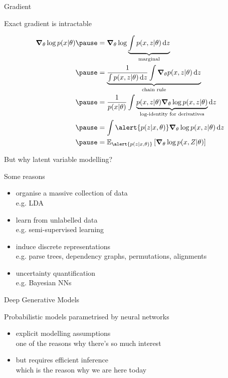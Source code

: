 \documentclass[14pt]{beamer}
\begin{document}
\begin{frame}{Gradient}

Exact gradient is intractable
\begin{small}
\begin{equation*}
\begin{aligned}
\grad_\theta \log p(x|\theta) \pause &= \grad_\theta \log \underbrace{\int p(x, z|\theta) \dd{z}}_{\text{marginal}} \\ \pause
&= \underbrace{\frac{1}{\int p(x, z|\theta) \dd{z}} \int \grad_\theta p(x,z|\theta) \dd{z}}_{\text{chain rule}} \\ \pause
&= \frac{1}{p(x|\theta)} \int \underbrace{p(x,z|\theta) \grad_\theta \log p(x,z|\theta)}_{\text{log-identity for derivatives}} \dd{z} \\ \pause
&= \int \alert{p(z|x, \theta)} \grad_\theta \log p(x,z|\theta) \dd{z} \\ \pause
&= \mathbb E_{\alert{p(z|x, \theta)}} \left[ \grad_\theta \log p(x,Z|\theta) \right]
\end{aligned}
\end{equation*}
\end{small}



\end{frame}


\begin{frame}{But why latent variable modelling?}

Some reasons

\begin{itemize}
	\item organise a massive collection of data\\
	e.g. LDA	 \pause
	\item learn from unlabelled data\\
	e.g. semi-supervised learning \pause
	\item induce discrete representations\\
	e.g. parse trees, dependency graphs, permutations, alignments \pause
	\item uncertainty quantification\\
	e.g. Bayesian NNs 
\end{itemize}

\end{frame}


\begin{frame}{Deep Generative Models}

Probabilistic models parametrised by neural networks
\begin{itemize}
	\pause
	\item explicit modelling assumptions\\
	one of the reasons why there's so much interest	
	\pause
	\item but requires efficient inference\\
	\pause
	\alert{which is the reason why we are here today}
\end{itemize}

\end{frame}
\end{document}
